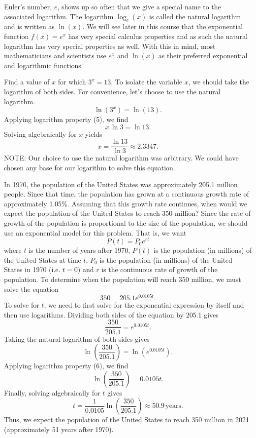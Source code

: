 Euler's number, $e$, shows up so often that we give a special name to the associated
logarithm.  The logarithm $\log_e (x)$ is called the natural logarithm and is written as
$\ln(x)$.  We will see later in this course that the exponential function $f(x) = e^x$ has
very special calculus properties and as such the natural logarithm has very special
properties as well.  With this in mind, most mathematicians and scientists use $e^x$ and
$\ln(x)$ as their preferred exponential and logarithmic functions.





\bex
Find a value of $x$ for which $3^{x}=13$.
\eex
To isolate the variable $x$, we should take the logarithm of both sides. For convenience,
let's choose to use the natural logarithm.
	\[
		\ln(3^{x})=\ln(13).
	\]
Applying logarithm property (5), we find
	\[
		x\,\ln 3=\ln 13.
	\]
Solving algebraically for $x$ yields
	\[
		x=\frac{\ln 13}{\ln 3}\approx2.3347.
	\]
NOTE: Our choice to use the natural logarithm was arbitrary. We could have chosen any base
for our logarithm to solve this equation.

\bex
In 1970, the population of the United States was approximately 205.1 million people. Since
that time, the population has grown at a continuous growth rate of approximately 1.05\%. Assuming that this growth rate continues, when would we expect the population of the United States to reach 350 million?
\eex
Since the rate of growth of the population is proportional to the size of the population, we should use an exponential model for this problem. That is, we want
	\[
		P(t)=P_{0}e^{rt}
	\]
where $t$ is the number of years after 1970, $P(t)$ is the population (in millions) of the
United States at time $t$, $P_{0}$ is the population (in millions) of the United States in
1970 (i.e. $t=0$) and $r$ is the continuous rate of growth of the population. To determine when the population will reach 350 million, we must solve the equation 
	\[
		350=205.1e^{0.0105t}.
	\]
To solve for $t$, we need to first solve for the exponential expression by itself and then use logarithms. Dividing both sides of the equation by 205.1 gives
	\[
		\frac{350}{205.1}=e^{0.0105t}.
	\]
Taking the natural logarithm of both sides gives
	\[
		\ln\left(\frac{350}{205.1}\right)=\ln\left(e^{0.0105t}\right).
	\]
Applying logarithm property (6), we find
	\[
		\ln\left(\frac{350}{205.1}\right)=0.0105t.
	\]
Finally, solving algebraically for $t$ gives
	\[
		t=\frac{1}{0.0105}\ln\left(\frac{350}{205.1}\right)\approx50.9\,\mbox{years}.
	\]
Thus, we expect the population of the United States to reach 350 million in 2021 (approximately 51 years after 1970).
\afterex

